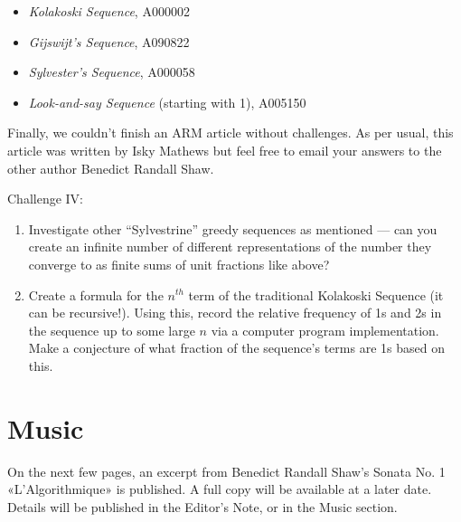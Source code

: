 \documentclass[11pt,a4paper]{report}
\begin{document}
\begin{multicols}{2}
		\begin{itemize}
			\item{\textit{Kolakoski Sequence}, A000002}
			\item{\textit{Gijswijt’s Sequence}, A090822}
			\item{\textit{Sylvester’s Sequence}, A000058}
			\item{\textit{Look-and-say Sequence} (starting with 1), A005150}
		\end{itemize}
		
		Finally, we couldn’t finish an ARM article without challenges. As per usual, this article was written by Isky Mathews but feel free to email your answers to the other author Benedict Randall Shaw.
		
		Challenge IV:
		\begin{enumerate}
			\item{Investigate other “Sylvestrine” greedy sequences as mentioned --- can you create an infinite number of different representations of the number they converge to as finite sums of unit fractions like above?}
			\item{Create a formula for the \(n^{th}\) term of the traditional Kolakoski Sequence (it can be recursive!). Using this, record the relative frequency of 1s and 2s in the sequence up to some large \(n\) via a computer program implementation. Make a conjecture of what fraction of the sequence’s terms are 1s based on this.}
		\end{enumerate}
		
	\end{multicols}
	
	\chapter{Music}
	
	\begin{multicols}{2}
		
		On the next few pages, an excerpt from Benedict Randall Shaw's Sonata No. 1 «L'Algorithmique» is published. A full copy will be available at a later date. Details will be published in the Editor's Note, or in the Music section.
		
	\end{multicols}	
	
	
	
	
	
\end{document}
